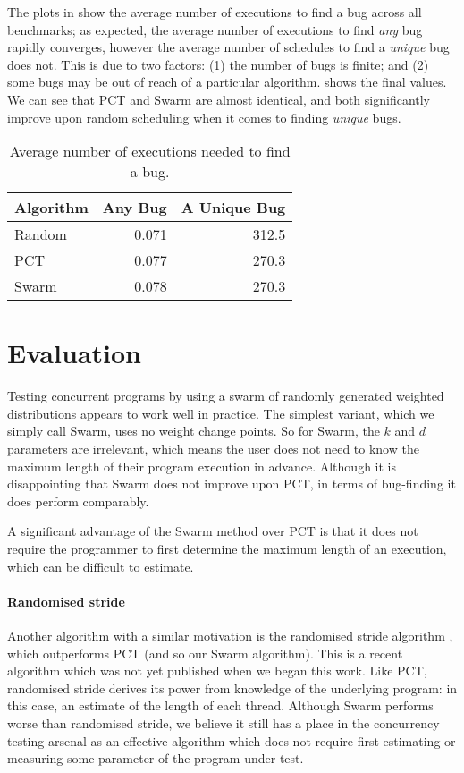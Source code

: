 The plots in  show the average number of executions
to find a bug across all benchmarks; as expected, the average number
of executions to find \emph{any} bug rapidly converges, however the
average number of schedules to find a \emph{unique} bug does not.
This is due to two factors: (1) the number of bugs is finite; and (2)
some bugs may be out of reach of a particular algorithm.
 shows the final values.  We can see that PCT and
Swarm are almost identical, and both significantly improve upon random
scheduling when it comes to finding \emph{unique} bugs.

\begin{table}
  \centering
  \begin{tabular}{lrr} \toprule
    Algorithm & Any Bug & A Unique Bug \\ \midrule
    Random & 0.071 & 312.5 \\
    PCT   & 0.077 & 270.3 \\
    Swarm & 0.078 & 270.3 \\ \bottomrule
  \end{tabular}
  \caption{Average number of executions needed to find a bug.}\label{tbl:freqs}
\end{table}

\section{Evaluation}
\label{sec:algorithms-eval}

Testing concurrent programs by using a swarm of randomly generated
weighted distributions appears to work well in practice.  The simplest
variant, which we simply call Swarm, uses no weight change points.  So
for Swarm, the $k$ and $d$ parameters are irrelevant, which means the
user does not need to know the maximum length of their program
execution in advance.  Although it is disappointing that Swarm does
not improve upon PCT, in terms of bug-finding it does perform
comparably.

A significant advantage of the Swarm method over PCT is that it does
not require the programmer to first determine the maximum length of an
execution, which can be difficult to estimate.

\paragraph{Randomised stride}
Another algorithm with a similar motivation is the randomised stride
algorithm \parencite{abdelrasoul2017}, which outperforms PCT (and so our
Swarm algorithm).  This is a recent algorithm which was not yet
published when we began this work.  Like PCT, randomised stride
derives its power from knowledge of the underlying program: in this
case, an estimate of the length of each thread.  Although Swarm
performs worse than randomised stride, we believe it still has a place
in the concurrency testing arsenal as an effective algorithm which
does not require first estimating or measuring some parameter of the
program under test.

